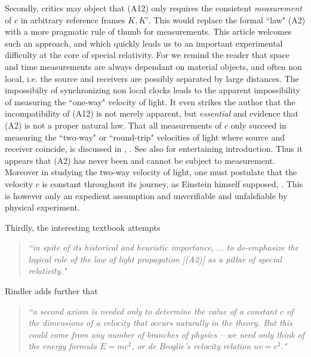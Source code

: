 \documentclass[12pt]{amsart}
\theoremstyle{definition}
\theoremstyle{remark}
\begin{document}
Secondly, critics may object that (A12) only requires the consistent \emph{measurement} of $c$ in arbitrary reference frames $K, K'$. This would replace the formal ``law" (A2) with a more pragmatic rule of thumb for measurements. This article welcomes such an approach, and which quickly leads us to an important experimental difficulty at the core of special relativity. For we remind the reader that space and time measurements are always dependant on material objects, and often non local, i.e. the source and receivers are possibly separated by large distances. The impossibiliy of synchronizing non local clocks leads to the apparent impossibility of measuring the ``one-way" velocity of light. It even strikes the author that the incompatibility of (A12) is not merely apparent, but \emph{essential} and evidence that (A2) is not a proper natural law. That all measurements of $c$ only succeed in measuring the ``two-way" or ``round-trip" velocities of light where source and receiver coincide, is discussed in \cite{zhang1997special}, \cite{israel}. See also \cite{vid} for entertaining introduction. Thus it appears that (A2) has never been and cannot be subject to measurement. Moreover in studying the two-way velocity of light, one must postulate that the velocity $c$ is constant throughout its journey, as Einstein himself supposed, \cite[Ch.8]{einstein2019relativity}. This is however only an expedient assumption and unverifiable and unfalsfiable by physical experiment.

Thirdly, the interesting textbook \cite[pp.8-10, 21-22]{rindler} attempts 
\begin{quote}
\emph{``in spite of its historical and heuristic importance, $\ldots$ to de-emphasize the logical role of the law of light propagation [(A2)] as a pillar of special relativity."}
\end{quote}
Rindler adds further that
\begin{quote}
\emph{``a second axiom is needed \emph{only} to determine the value of a constant $c$ of the dimensions of a velocity that occurs naturally in the theory. But this could come from any number of branches of physics -- we need only think of the energy formula $E=mc^2$, or de Broglie's velocity relation $u v =c^2$." }
\end{quote}
\end{document}
